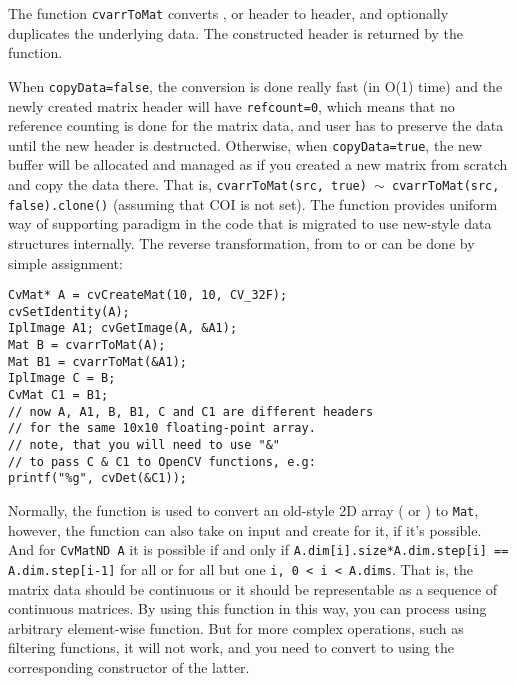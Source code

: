 The function \texttt{cvarrToMat} converts ,  or  header to  header, and optionally duplicates the underlying data. The constructed header is returned by the function.

When \texttt{copyData=false}, the conversion is done really fast (in O(1) time) and the newly created matrix header will have \texttt{refcount=0}, which means that no reference counting is done for the matrix data, and user has to preserve the data until the new header is destructed. Otherwise, when \texttt{copyData=true}, the new buffer will be allocated and managed as if you created a new matrix from scratch and copy the data there. That is,
\texttt{cvarrToMat(src, true) $\sim$ cvarrToMat(src, false).clone()} (assuming that COI is not set). The function provides uniform way of supporting  paradigm in the code that is migrated to use new-style data structures internally. The reverse transformation, from  to  or  can be done by simple assignment:

\begin{lstlisting}
CvMat* A = cvCreateMat(10, 10, CV_32F);
cvSetIdentity(A);
IplImage A1; cvGetImage(A, &A1);
Mat B = cvarrToMat(A);
Mat B1 = cvarrToMat(&A1);
IplImage C = B;
CvMat C1 = B1;
// now A, A1, B, B1, C and C1 are different headers
// for the same 10x10 floating-point array.
// note, that you will need to use "&"
// to pass C & C1 to OpenCV functions, e.g:
printf("%g", cvDet(&C1));
\end{lstlisting}

Normally, the function is used to convert an old-style 2D array ( or ) to \texttt{Mat}, however, the function can also take  on input and create  for it, if it's possible. And for \texttt{CvMatND A} it is possible if and only if \texttt{A.dim[i].size*A.dim.step[i] == A.dim.step[i-1]} for all or for all but one \texttt{i, 0 < i < A.dims}. That is, the matrix data should be continuous or it should be representable as a sequence of continuous matrices. By using this function in this way, you can process  using arbitrary element-wise function. But for more complex operations, such as filtering functions, it will not work, and you need to convert  to  using the corresponding constructor of the latter.

